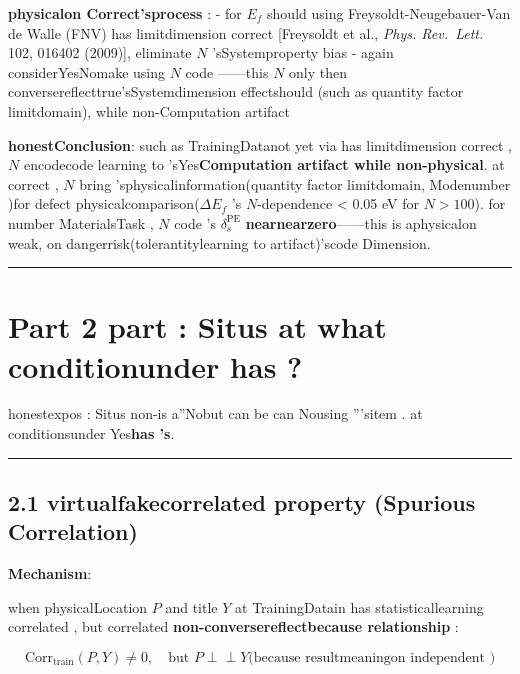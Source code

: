 \documentclass[
  12pt,
]{article}
\begin{document}
\textbf{physicalon Correct'sprocess }:  - for  \(E_f\) should using  Freysoldt-Neugebauer-Van
de Walle (FNV) has limitdimension correct  {[}Freysoldt et al., \emph{Phys. Rev.~Lett.}
102, 016402 (2009){]}, eliminate  \(N\) 'sSystemproperty bias  -
\textbf{}again  considerYesNomake using  \(N\) code ------this \(N\)
only then conversereflecttrue'sSystemdimension effectshould (such as quantity factor limitdomain), while non-Computation artifact

\textbf{honestConclusion}: such as TrainingDatanot yet via has limitdimension correct , \(N\)
encodecode learning to 'sYes\textbf{Computation artifact while non-physical}. at correct , \(N\)
bring 'sphysicalinformation(quantity factor limitdomain, Modenumber )for defect physicalcomparison(\(\Delta E_f\)
's \(N\)-dependence \textless{} 0.05 eV for
\(N > 100\)). for number MaterialsTask , \(N\) code 's \(\delta_s^{\text{PE}}\)
\textbf{nearnearzero}------this is aphysicalon weak, on dangerrisk(tolerantitylearning to 
artifact)'scode Dimension. 

\begin{center}\rule{0.5\linewidth}{0.5pt}\end{center}

\section{Part 2 part : Situs
at what conditionunder has  ?}\label{ux7b2c-2-ux90e8ux5206situs-ux5728ux4ec0ux4e48ux60c5ux51b5ux4e0bux6709ux5bb3}

honestexpos : Situs
non-is a''Nobut can be can Nousing '''sitem . at conditionsunder Yes\textbf{has  's}. 

\begin{center}\rule{0.5\linewidth}{0.5pt}\end{center}

\subsection{2.1 virtualfakecorrelated property (Spurious
Correlation)}\label{ux865aux5047ux76f8ux5173ux6027spurious-correlation}

\textbf{Mechanism}: 

when physicalLocation \(P\) and title  \(Y\)
at TrainingDatain has statisticallearning correlated , but correlated \textbf{non-conversereflectbecause relationship }: 

\[\text{Corr}_{\text{train}}(P, Y) \neq 0, \quad \text{but  } P \perp\!\!\!\perp Y \text{(because resultmeaningon independent )}\]
\end{document}
